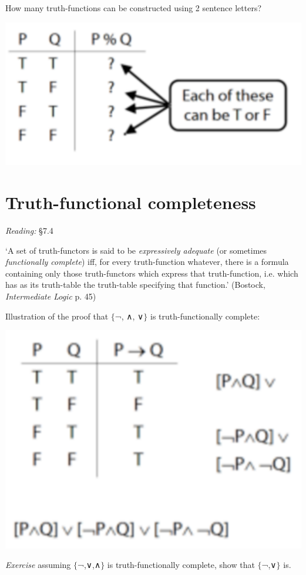\documentclass[12pt]{extarticle}
\begin{document}
\begin{multicols*}{3}
How many truth-functions can be constructed using 2 sentence letters?
 
\begin{center}
\includegraphics[scale=0.3]{img/unit_430_fig1.pdf}
\end{center}
 
 
\section{Truth-functional completeness}
 
\emph{Reading:} §7.4
 
‘A set of truth-functors is said to be \emph{expressively adequate} (or sometimes \emph{functionally complete}) iff, for every truth-function whatever, there is a formula containing only those truth-functors which express that truth-function, i.e. which has as its truth-table the truth-table specifying that function.’ (Bostock, \emph{Intermediate Logic} p. 45)
 
Illustration of the proof that $\{$¬, ∧, ∨$\}$ is truth-functionally complete:
 
\begin{center}
\includegraphics[scale=0.3]{img/unit_430_fig2.pdf}
\end{center}
\emph{Exercise} assuming $\{$¬,∨,∧$\}$ is truth-functionally complete, show that $\{$¬,∨$\}$ is.
 

\end{multicols*}
\end{document}

